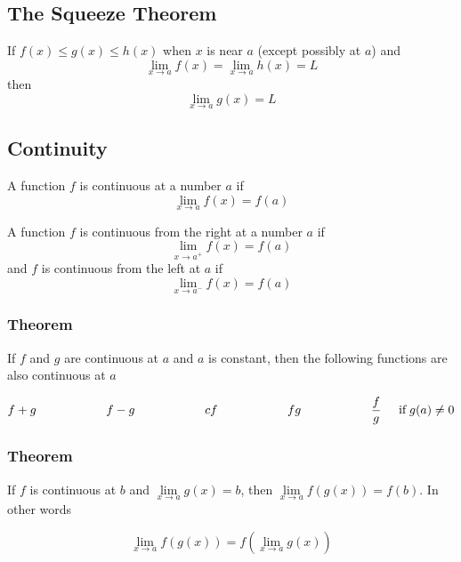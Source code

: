 \documentclass{article}
\begin{document}
\subsection*{The Squeeze Theorem}
If \( f(x) \leq g(x) \leq h(x)\) when \( x \) is near \( a \) (except possibly at \( a \)) and
\[
\lim_{x \to a} f(x) = \lim_{x \to a} h(x) = L
\]
then
\[
\lim_{x \to a} g(x) = L
\]

\subsection*{Continuity}
A function \(f\) is continuous at a number \(a\) if
\[
\lim_{x \to a} f(x) = f(a)
\]

A function \(f\) is continuous from the right at a number \(a\) if
\[
\lim_{x \to a^+} f(x) = f(a)
\]
and \(f\) is continuous from the left at \(a\) if
\[
\lim_{x \to a^-} f(x) = f(a)
\]

\subsubsection*{Theorem} 
If \(f\) and \(g\) are continuous at \(a\) and \(a\) is constant, then the following functions are also continuous at \(a\)

\[
f + g \hspace{2cm} f-g \hspace{2cm} cf \hspace{2cm} fg \hspace{2cm} \frac{f}{g}  \hspace{.5cm} \text{if} \;  g(a) \neq 0
\]

\subsubsection*{Theorem} 
If \(f\) is continuous at \(b\) and \( \lim\limits_{x \to a} g(x) = b\), then  \( \lim\limits_{x \to a} f(g(x)) = f(b)\).
In other words

\[
\lim_{x \to a} f(g(x)) = f(\lim\limits_{x \to a} g(x))
\]
\end{document}

